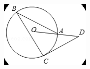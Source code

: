 \documentclass[12pt]{article}
\begin{document}
\begin{center}
\begin{minipage}{0.32\textwidth}
\includegraphics[width=0.95\linewidth]{out_rommath_origin/items/geo578-origin/assets/figure_circle.png}
\end{minipage}
\par
\end{center}
\bigskip
\end{document}
